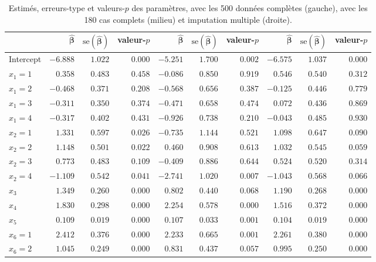 \documentclass[
  11pt,
  letterpaper,
]{book}
\theoremstyle{definition}
\theoremstyle{definition}
\theoremstyle{definition}
\theoremstyle{remark}
\begin{document}
\begin{table}

\caption{\label{tab:missing3r}Estimés, erreurs-type et valeurs-$p$ des paramètres,  avec les 500 données complètes (gauche), avec les 180 cas complets (milieu) et imputation multiple (droite).}
\centering
\begin{tabular}[t]{lrrrrrrrrr}
\toprule
  & $\widehat{\boldsymbol{\beta}}$ & $\mathrm{se}(\widehat{\boldsymbol{\beta}})$ & valeur-$p$ & $\widehat{\boldsymbol{\beta}}$ & $\mathrm{se}(\widehat{\boldsymbol{\beta}})$ & valeur-$p$ & $\widehat{\boldsymbol{\beta}}$ & $\mathrm{se}(\widehat{\boldsymbol{\beta}})$ & valeur-$p$\\
\midrule
Intercept & $-6.888$ & $1.022$ & $0.000$ & $-5.251$ & $1.700$ & $0.002$ & $-6.575$ & $1.037$ & $0.000$\\
$x_1=1$ & $0.358$ & $0.483$ & $0.458$ & $-0.086$ & $0.850$ & $0.919$ & $0.546$ & $0.540$ & $0.312$\\
$x_1=2$ & $-0.468$ & $0.371$ & $0.208$ & $-0.568$ & $0.656$ & $0.387$ & $-0.125$ & $0.446$ & $0.779$\\
$x_1=3$ & $-0.311$ & $0.350$ & $0.374$ & $-0.471$ & $0.658$ & $0.474$ & $0.072$ & $0.436$ & $0.869$\\
$x_1=4$ & $-0.317$ & $0.402$ & $0.431$ & $-0.926$ & $0.738$ & $0.210$ & $-0.043$ & $0.485$ & $0.930$\\
\addlinespace
$x_2=1$ & $1.331$ & $0.597$ & $0.026$ & $-0.735$ & $1.144$ & $0.521$ & $1.098$ & $0.647$ & $0.090$\\
$x_2=2$ & $1.148$ & $0.501$ & $0.022$ & $0.460$ & $0.908$ & $0.613$ & $1.032$ & $0.545$ & $0.059$\\
$x_2=3$ & $0.773$ & $0.483$ & $0.109$ & $-0.409$ & $0.886$ & $0.644$ & $0.524$ & $0.520$ & $0.314$\\
$x_2=4$ & $-1.109$ & $0.542$ & $0.041$ & $-2.741$ & $1.020$ & $0.007$ & $-1.043$ & $0.568$ & $0.066$\\
$x_3$ & $1.349$ & $0.260$ & $0.000$ & $0.802$ & $0.440$ & $0.068$ & $1.190$ & $0.268$ & $0.000$\\
\addlinespace
$x_4$ & $1.830$ & $0.298$ & $0.000$ & $2.254$ & $0.578$ & $0.000$ & $1.516$ & $0.372$ & $0.000$\\
$x_5$ & $0.109$ & $0.019$ & $0.000$ & $0.107$ & $0.033$ & $0.001$ & $0.104$ & $0.019$ & $0.000$\\
$x_6=1$ & $2.412$ & $0.376$ & $0.000$ & $2.233$ & $0.665$ & $0.001$ & $2.261$ & $0.380$ & $0.000$\\
$x_6=2$ & $1.045$ & $0.249$ & $0.000$ & $0.831$ & $0.437$ & $0.057$ & $0.995$ & $0.250$ & $0.000$\\
\bottomrule
\end{tabular}
\end{table}
\end{document}
